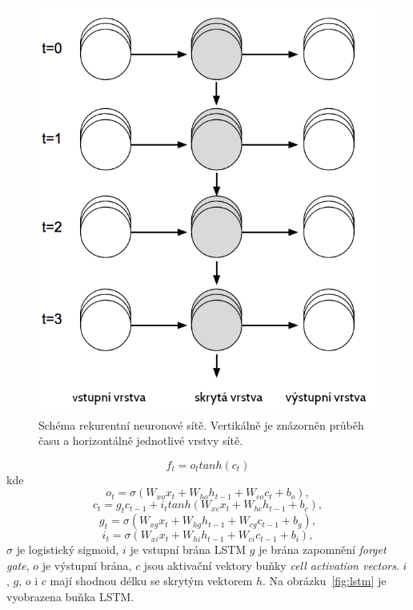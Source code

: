 \begin{figure}[htpb]
\includegraphics[scale=1]{rc/rnn1h.png}
\caption{
    Schéma rekurentní neuronové sítě. Vertikálně je znázorněn průběh času a
    horizontálně jednotlivé vrstvy sítě.
}
\label{fig:rnn}
\end{figure}

\begin{equation}
f_t = o_t tanh(c_t)
\end{equation}
kde
\begin{equation}
o_t = \sigma(W_{xo}x_t + W_{ho}h_{t-1} + W_{co}c_t + b_o),
\end{equation}
\begin{equation}
c_t = g_{t}c_{t-1} + i_t tanh(W_{xc}x_t + W_{hc}h_{t-1} + b_c),
\end{equation}
\begin{equation}
g_t = \sigma(W_{xg}x_t + W_{hg}h_{t-1} + W_{cg}c_{t-1} + b_g),
\end{equation}
\begin{equation}
i_t = \sigma(W_{xi}x_t + W_{hi}h_{t-1} + W_{ci}c_{t-1} + b_i),
\end{equation}
$\sigma$ je logistický sigmoid, $i$ je vstupní brána LSTM $g$ je brána zapomnění
\textit{forget gate}, $o$ je výstupní brána, $c$ jsou aktivační vektory buňky
\textit{cell activation vectors}. $i$, $g$, $o$ i $c$ mají shodnou délku se
skrytým vektorem $h$. Na obrázku~\ref{fig:lstm} je vyobrazena buňka LSTM.

